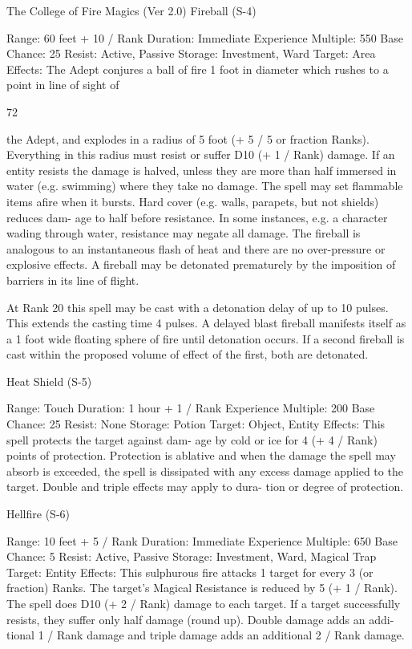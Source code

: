 \begin{Chapter}{The College of Fire Magics (Ver 2.0)}
Fireball (S-4) 

Range: 60 feet + 10 / Rank 
Duration: Immediate 
Experience Multiple: 550 
Base Chance: 25%
Resist: Active, Passive 
Storage: Investment, Ward 
Target: Area 
Effects: The Adept conjures a ball of fire 1 foot in 
diameter which rushes to a point in line of sight of 

72 

the Adept, and explodes in a radius of 5 foot (+ 5 / 
5 or fraction Ranks). Everything in this radius must 
resist  or  suffer  D10  (+  1  /  Rank)  damage.  If  an 
entity resists the damage is halved, unless they are 
more than half immersed in water (e.g. swimming) 
where  they  take  no  damage.  The  spell  may  set 
flammable  items  afire  when  it  bursts.  Hard  cover 
(e.g. walls, parapets, but not shields) reduces dam-
age  to  half  before  resistance.  In  some  instances, 
e.g.  a  character  wading  through  water,  resistance 
may negate all damage. The fireball is analogous to 
an  instantaneous  flash  of  heat  and  there  are  no 
over-pressure  or  explosive  effects.  A  fireball  may 
be  detonated  prematurely  by  the  imposition  of 
barriers in its line of flight. 

At Rank 20 this spell may be cast with a detonation 
delay  of  up  to  10  pulses.  This  extends  the  casting 
time  4  pulses.  A  delayed  blast  fireball  manifests 
itself  as  a  1  foot  wide  floating  sphere  of  fire  until 
detonation occurs. If a second fireball is cast within 
the proposed volume of effect of the first, both are 
detonated. 

Heat Shield (S-5) 

Range: Touch 
Duration: 1 hour + 1 / Rank 
Experience Multiple: 200 
Base Chance: 25%
Resist: None 
Storage: Potion 
Target: Object, Entity 
Effects:  This  spell  protects  the  target  against dam-
age  by  cold  or  ice  for  4  (+  4  /  Rank)  points  of 
protection.  Protection  is  ablative  and  when  the 
damage the spell may absorb is exceeded, the spell 
is dissipated with any excess damage applied to the 
target. Double and triple effects may apply to dura-
tion or degree of protection. 

Hellfire (S-6) 

Range: 10 feet + 5 / Rank 
Duration: Immediate 
Experience Multiple: 650 
Base Chance: 5%
Resist: Active, Passive 
Storage: Investment, Ward, Magical Trap 
Target: Entity 
Effects:  This  sulphurous  fire  attacks  1  target  for 
every  3  (or  fraction)  Ranks.  The  target’s  Magical 
Resistance is reduced by 5 (+ 1 / Rank). The spell 
does D10 (+ 2 / Rank) damage to each target.  If a 
target  successfully  resists,  they  suffer  only  half 
damage  (round  up).  Double  damage  adds  an  addi-
tional 1 / Rank damage and triple damage adds an 
additional 2 / Rank damage. 


\end{Chapter}
